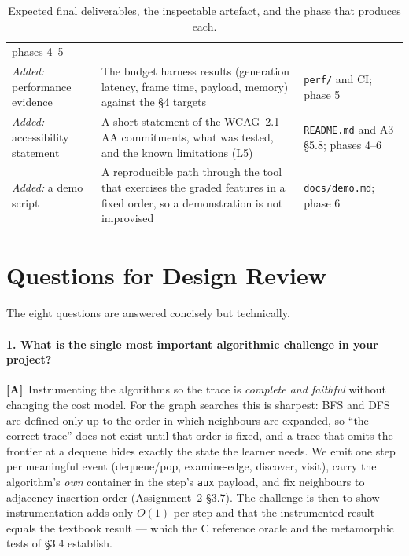 \documentclass[11pt,a4paper]{article}
\newcommand{\A}{\textcolor{asmc}{\textbf{[A]}}}     %
\newcommand{\ct}[1]{\texttt{#1}}
\begin{document}
\begin{table}[H]
\begin{tabular}{@{}L{3.6cm}L{6.6cm}L{4.2cm}@{}}
phases 4--5 \\
\emph{Added:} performance evidence & The budget harness results (generation latency, frame
time, payload, memory) against the \S4 targets & \ct{perf/} and CI; phase 5 \\
\emph{Added:} accessibility statement & A short statement of the WCAG~2.1 AA commitments, what
was tested, and the known limitations (L5) & \ct{README.md} and A3 \S5.8; phases 4--6 \\
\emph{Added:} a demo script & A reproducible path through the tool that exercises the graded
features in a fixed order, so a demonstration is not improvised & \ct{docs/demo.md}; phase 6 \\
\bottomrule
\end{tabular}
\caption{Expected final deliverables, the inspectable artefact, and the phase that produces
each.}
\label{tab:deliverables}
\end{table}

\section{Questions for Design Review}

\noindent The eight questions are answered concisely but technically.

\paragraph{1. What is the single most important algorithmic challenge in your project?}
\A\ Instrumenting the algorithms so the trace is \emph{complete and faithful} without changing
the cost model. For the graph searches this is sharpest: BFS and DFS are defined only up to the
order in which neighbours are expanded, so ``the correct trace'' does not exist until that order
is fixed, and a trace that omits the frontier at a dequeue hides exactly the state the learner
needs. We emit one step per meaningful event (dequeue/pop, examine-edge, discover, visit), carry
the algorithm's \emph{own} container in the step's \ct{aux} payload, and fix neighbours to
adjacency insertion order (Assignment~2 \S3.7). The challenge is then to show instrumentation adds
only $O(1)$ per step and that the instrumented result equals the textbook result --- which the C
reference oracle and the metamorphic tests of \S3.4 establish.
\end{document}
